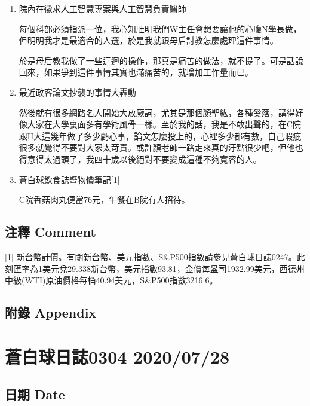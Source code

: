 \documentclass[
]{article}
\begin{document}
\begin{enumerate}
\def\labelenumi{\arabic{enumi}.}
\item
  院內在徵求人工智慧專案與人工智慧負責醫師

  每個科部必須指派一位，我心知肚明我們W主任會想要讓他的心腹N學長做，但明明我才是最適合的人選，於是我就跟母后討教怎麼處理這件事情。

  於是母后教我做了一些迂迴的操作，那真是痛苦的做法，就不提了。可是話說回來，如果爭到這件事情其實也滿痛苦的，就增加工作量而已。
\item
  最近政客論文抄襲的事情大轟動

  然後就有很多網路名人開始大放厥詞，尤其是那個顏聖紘，各種奚落，講得好像大家在大學裏面多有學術風骨一樣。至於我的話，我是不敢出聲的，在C院跟H大這幾年做了多少虧心事，論文怎麼投上的，心裡多少都有數，自己瑕疵很多就覺得不要對大家太苛責。或許顏老師一路走來真的汙點很少吧，但他也得意得太過頭了，我四十歲以後絕對不要變成這種不夠寬容的人。
\item
  蒼白球飲食誌暨物價筆記{[}1{]}

  C院香菇肉丸便當76元，午餐在B院有人招待。
\end{enumerate}

\hypertarget{ux6ce8ux91cb-comment-26}{%
\subsection{注釋 Comment}\label{ux6ce8ux91cb-comment-26}}

{[}1{]}
新台幣計價。有關新台幣、美元指數、S\&P500指數請參見蒼白球日誌0247。此刻匯率為1美元兌29.338新台幣，美元指數93.81，金價每盎司1932.99美元，西德州中級(WTI)原油價格每桶40.94美元，S\&P500指數3216.6。

\hypertarget{ux9644ux9304-appendix-26}{%
\subsection{附錄 Appendix}\label{ux9644ux9304-appendix-26}}

\hypertarget{ux84bcux767dux7403ux65e5ux8a8c0304-20200728}{%
\section{蒼白球日誌0304
2020/07/28}\label{ux84bcux767dux7403ux65e5ux8a8c0304-20200728}}

\hypertarget{ux65e5ux671f-date-27}{%
\subsection{日期 Date}\label{ux65e5ux671f-date-27}}
\end{document}

